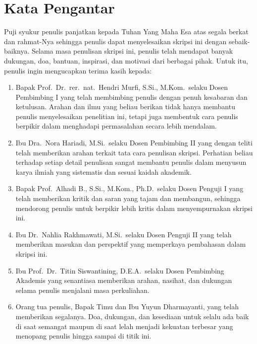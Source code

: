 \chapter*{Kata Pengantar}
Puji syukur penulis panjatkan kepada Tuhan Yang Maha Esa atas segala berkat 
dan rahmat-Nya sehingga penulis dapat menyelesaikan skripsi ini dengan 
sebaik-baiknya. 
Selama masa penulisan skripsi ini, penulis telah mendapat banyak dukungan, 
doa, bantuan, inspirasi, dan motivasi dari berbagai pihak. 
Untuk itu, penulis ingin mengucapkan terima kasih kepada:
\begin{enumerate}
    \item Bapak Prof.\ Dr.\ rer.\ nat.\ Hendri Murfi, S.Si., M.Kom.\ selaku 
        Dosen Pembimbing I yang telah membimbing penulis dengan penuh 
        kesabaran dan ketulusan. Arahan dan ilmu yang beliau berikan tidak 
        hanya membantu penulis menyelesaikan penelitian ini, tetapi juga 
        membentuk cara penulis berpikir dalam menghadapi permasalahan 
        secara lebih mendalam.
    \item Ibu Dra.\ Nora Hariadi, M.Si.\ selaku Dosen Pembimbing II yang 
        dengan teliti telah memberikan arahan terkait tata cara penulisan 
        skripsi. Perhatian beliau terhadap setiap detail penulisan sangat 
        membantu penulis dalam menyusun karya ilmiah yang sistematis dan 
        sesuai kaidah akademik.
    \item Bapak Prof.\ Alhadi B., S.Si., M.Kom., Ph.D.\ selaku Dosen Penguji 
        I yang telah memberikan kritik dan saran yang tajam dan membangun, 
        sehingga mendorong penulis untuk berpikir lebih kritis dalam 
        menyempurnakan skripsi ini.
    \item Ibu Dr.\ Nahlia Rakhmawati, M.Si.\ selaku Dosen Penguji II 
        yang telah memberikan masukan dan perspektif yang memperkaya 
        pembahasan dalam skripsi ini.
    \item Ibu Prof.\ Dr.\ Titin Siswantining, D.E.A.\ selaku Dosen 
        Pembimbing Akademis yang senantiasa memberikan arahan, nasihat, 
        dan dukungan selama penulis menjalani masa perkuliahan.
    \item Orang tua penulis, Bapak Timu dan Ibu Yuyun Dharmayanti, yang 
        telah memberikan segalanya. Doa, dukungan, dan kesediaan untuk 
        selalu ada baik di saat semangat maupun di saat lelah menjadi 
        kekuatan terbesar yang menopang penulis hingga sampai di titik ini.

\end{enumerate}
